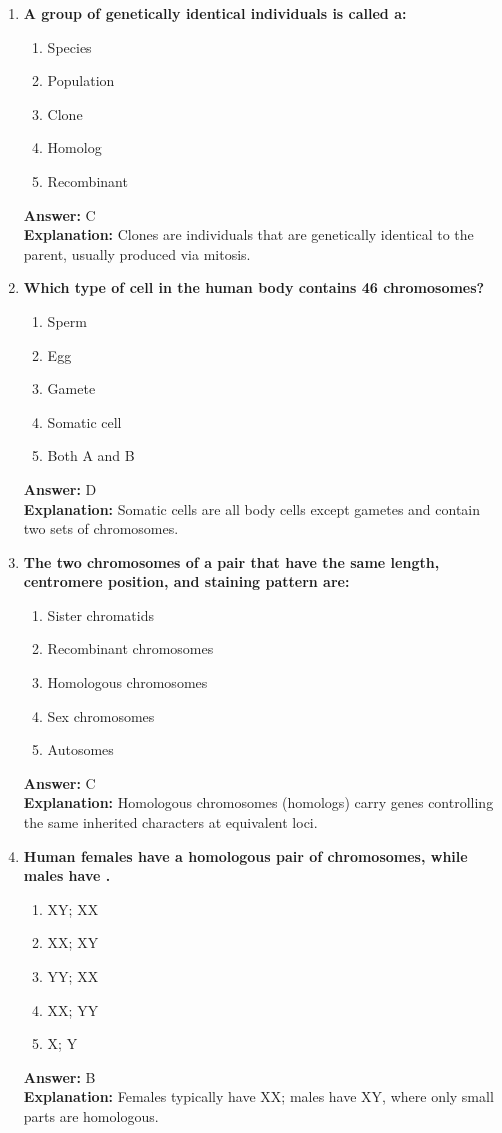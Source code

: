 \documentclass[11pt, a4paper]{article}
\begin{document}
\begin{enumerate}[leftmargin=*, label=\arabic*.]
\item \textbf{A group of genetically identical individuals is called a:}
\begin{enumerate}[label=\Alph*.]
\item Species
\item Population
\item Clone
\item Homolog
\item Recombinant
\end{enumerate}
\textbf{Answer:} C \\
\textbf{Explanation:} Clones are individuals that are genetically identical to the parent, usually produced via mitosis.

\item \textbf{Which type of cell in the human body contains 46 chromosomes?}
\begin{enumerate}[label=\Alph*.]
\item Sperm
\item Egg
\item Gamete
\item Somatic cell
\item Both A and B
\end{enumerate}
\textbf{Answer:} D \\
\textbf{Explanation:} Somatic cells are all body cells except gametes and contain two sets of chromosomes.

\item \textbf{The two chromosomes of a pair that have the same length, centromere position, and staining pattern are:}
\begin{enumerate}[label=\Alph*.]
\item Sister chromatids
\item Recombinant chromosomes
\item Homologous chromosomes
\item Sex chromosomes
\item Autosomes
\end{enumerate}
\textbf{Answer:} C \\
\textbf{Explanation:} Homologous chromosomes (homologs) carry genes controlling the same inherited characters at equivalent loci.

\item \textbf{Human females have a homologous pair of \underline{\hspace{1cm}} chromosomes, while males have \underline{\hspace{1cm}}.}
\begin{enumerate}[label=\Alph*.]
\item XY; XX
\item XX; XY
\item YY; XX
\item XX; YY
\item X; Y
\end{enumerate}
\textbf{Answer:} B \\
\textbf{Explanation:} Females typically have XX; males have XY, where only small parts are homologous.


\end{enumerate}
\end{document}
